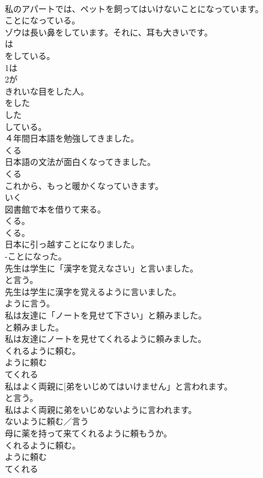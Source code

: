 \documentclass[8pt]{extreport}
\begin{document}
\begin{CJK}{UTF8}{min}
{\\	私のアパートでは、ペットを飼ってはいけないことになっています。	
\\	ことになっている。 
\\	ゾウは長い鼻をしています。それに、耳も大きいです。	
\\	は 
\\	をしている。 
\\	1は
\\	2が 
\\	きれいな目をした人。	
\\	をした 
\\	した 
\\	している。
\\	４年間日本語を勉強してきました。	
\\	くる 
\\	日本語の文法が面白くなってきました。	
\\	くる 
\\	これから、もっと暖かくなっていきます。	
\\	いく 
\\	図書館で本を借りて来る。	
\\	くる。 
\\	くる。
\\	日本に引っ越すことになりました。	
\\	-ことになった。 
\\	先生は学生に「漢字を覚えなさい」と言いました。	
\\	と言う。
\\	先生は学生に漢字を覚えるように言いました。	
\\	ように言う。 
\\	私は友達に「ノートを見せて下さい」と頼みました。	
\\	と頼みました。
\\	私は友達にノートを見せてくれるように頼みました。	
\\	くれるように頼む。 
\\	ように頼む 
\\	てくれる 
\\	私はよく両親に[弟をいじめてはいけません」と言われます。	
\\	と言う。
\\	私はよく両親に弟をいじめないように言われます。	
\\	ないように頼む／言う　 
\\	母に薬を持って来てくれるように頼もうか。	
\\	くれるように頼む。 
\\	ように頼む 
\\	てくれる 
}
\end{CJK}
\end{document}

